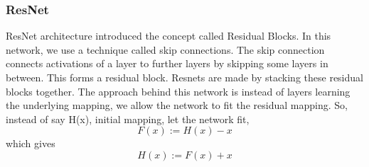         \subsubsection{ResNet}
            ResNet architecture introduced the concept called Residual Blocks. In this network, we use a technique called skip connections. The skip connection connects activations of a  layer to further layers by skipping some layers in between. This forms a residual block. Resnets are made by stacking these residual blocks together. The approach behind this network is instead of layers learning the underlying mapping, we allow the network to fit the residual mapping. So, instead of say H(x), initial mapping, let the network fit,
            \begin{equation}
                F(x) := H(x) - x
            \end{equation}
            which gives
            \begin{equation}
                H(x) := F(x) + x
            \end{equation}
            \begin{figure}[hbt!]
            \end{figure}

        \newpage
